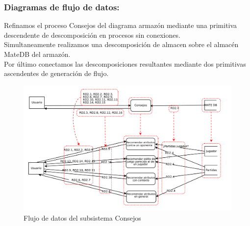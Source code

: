 \subsubsection{Diagramas de flujo de datos:}

Refinamos el proceso Consejos del diagrama armazón mediante
una primitiva descendente de descomposición en procesos sin conexiones.\\
Simultaneamente realizamos una descomposición de almacen sobre el
almacén MateDB del armazón.\\
Por último conectamos las descomposiciones resultantes mediante dos
primitivas ascendentes de generación de flujo.\\ 
 
\begin{figure}[h!]
\centering
\includegraphics[width=0.7\linewidth]{../Diagramas/pdf/RefinamientoConsejos.pdf}
\caption{Flujo de datos del subsistema Consejos}

\label{fig:RefinamientoConsejos}
\end{figure}
